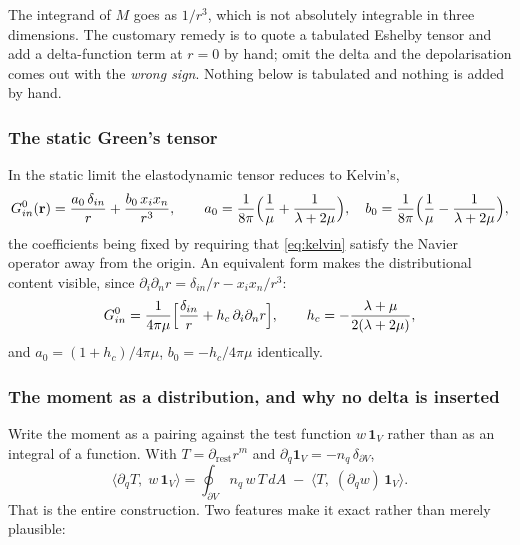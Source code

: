 \documentclass[11pt,a4paper]{article}
\begin{document}
The integrand of $M$ goes as $1/r^3$, which is not absolutely integrable in
three dimensions.  The customary remedy is to quote a tabulated Eshelby tensor \cite{eshelby1957,mura1987}
and add a delta-function term at $r=0$ by hand; omit the delta and the
depolarisation comes out with the \emph{wrong sign}.  Nothing below is
tabulated and nothing is added by hand.

\subsubsection{The static Green's tensor}

In the static limit the elastodynamic tensor reduces to Kelvin's,
\begin{equation}\label{eq:kelvin}
  G^0_{in}(\mathbf{r}) = \frac{a_0\,\delta_{in}}{r} + \frac{b_0\,x_ix_n}{r^3},
  \qquad
  a_0 = \frac{1}{8\pi}\Bigl(\frac1\mu + \frac{1}{\lambda+2\mu}\Bigr),
  \quad
  b_0 = \frac{1}{8\pi}\Bigl(\frac1\mu - \frac{1}{\lambda+2\mu}\Bigr),
\end{equation}
the coefficients being fixed by requiring that \eqref{eq:kelvin} satisfy the
Navier operator away from the origin.  An equivalent form makes the
distributional content visible, since $\partial_i\partial_n r = \delta_{in}/r -
x_ix_n/r^3$:
\begin{equation}\label{eq:kelvinhc}
  G^0_{in} = \frac{1}{4\pi\mu}\Bigl[\frac{\delta_{in}}{r}
             + h_c\,\partial_i\partial_n r\Bigr],
  \qquad h_c = -\frac{\lambda+\mu}{2(\lambda+2\mu)} ,
\end{equation}
and $a_0 = (1+h_c)/4\pi\mu$, $b_0 = -h_c/4\pi\mu$ identically.

\subsubsection{The moment as a distribution, and why no delta is inserted}

Write the moment as a pairing against the test function $w\,\mathbf{1}_V$
rather than as an integral of a function.  With $T = \partial_{\text{rest}}r^m$
and $\partial_q\mathbf{1}_V = -n_q\,\delta_{\partial V}$,
\begin{equation}\label{eq:recursion}
  \langle \partial_q T,\; w\,\mathbf{1}_V\rangle
  = \oint_{\partial V} n_q\,w\,T\,dA
  \;-\; \langle T,\; (\partial_q w)\,\mathbf{1}_V\rangle .
\end{equation}
That is the entire construction.  Two features make it exact rather than merely
plausible:
\end{document}
